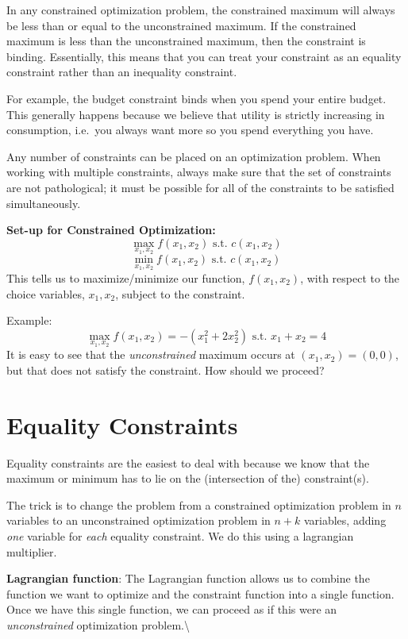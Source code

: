 \documentclass[]{book}
\theoremstyle{definition}
\theoremstyle{definition}
\theoremstyle{definition}
\theoremstyle{remark}
\begin{document}
In any constrained optimization problem, the constrained maximum will
always be less than or equal to the unconstrained maximum. If the
constrained maximum is less than the unconstrained maximum, then the
constraint is binding. Essentially, this means that you can treat your
constraint as an equality constraint rather than an inequality
constraint.

For example, the budget constraint binds when you spend your entire
budget. This generally happens because we believe that utility is
strictly increasing in consumption, i.e.~you always want more so you
spend everything you have.

Any number of constraints can be placed on an optimization problem. When
working with multiple constraints, always make sure that the set of
constraints are not pathological; it must be possible for all of the
constraints to be satisfied simultaneously.

\textbf{Set-up for Constrained Optimization:}
\[\max_{x_1,x_2} f(x_1,x_2) \text{ s.t. } c(x_1,x_2)\]
\[\min_{x_1,x_2} f(x_1,x_2) \text{ s.t. } c(x_1,x_2)\] This tells us to
maximize/minimize our function, \(f(x_1,x_2)\), with respect to the
choice variables, \(x_1,x_2\), subject to the constraint.

Example:
\[\max_{x_1,x_2} f(x_1, x_2) = -(x_1^2 + 2x_2^2) \text{ s.t. }x_1 + x_2 = 4\]
It is easy to see that the \textit{unconstrained} maximum occurs at
\((x_1, x_2) = (0,0)\), but that does not satisfy the constraint. How
should we proceed?

\section{Equality Constraints}\label{equality-constraints}

Equality constraints are the easiest to deal with because we know that
the maximum or minimum has to lie on the (intersection of the)
constraint(s).

The trick is to change the problem from a constrained optimization
problem in \(n\) variables to an unconstrained optimization problem in
\(n + k\) variables, adding \textit{one} variable for \textit{each}
equality constraint. We do this using a lagrangian multiplier.

\textbf{Lagrangian function}: The Lagrangian function allows us to
combine the function we want to optimize and the constraint function
into a single function. Once we have this single function, we can
proceed as if this were an \textit{unconstrained} optimization
problem.\textbackslash{}
\end{document}
